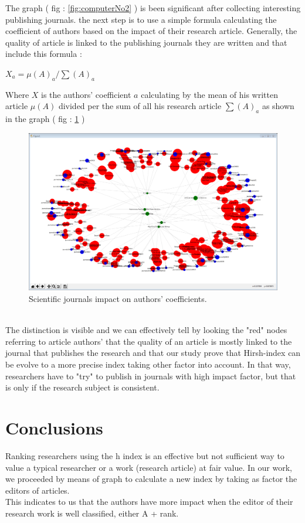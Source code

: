 \documentclass[times, twoside]{zHenriquesLab-StyleBioRxiv}
\begin{document}
The graph ( fig : \ref{fig:computerNo2} ) is been significant after collecting interesting publishing journals. the next step is to use a simple formula calculating the coefficient of authors based on the impact of their research article. Generally, the quality of article is linked to the publishing journals they are written and that include this formula :\\
\begin{center}
 $
    X_{a} = \mu (A)_{a} /\sum (A)_{a}
$
\end{center}
Where  $X$ is the authors' coefficient $a$ calculating by the mean of his written article $\mu (A)$ divided per the sum of all his research article $\sum (A)_{a}$ as shown in the graph ( fig : \ref{fig:computerNo3} )
\begin{figure}[h]
\centering
\includegraphics[width=.8\linewidth]{Figures/Graph_dernier.png}
\caption{Scientific journals impact on authors' coefficients.}
\label{fig:computerNo3}
\end{figure}
\\

The distinction is visible and we can effectively tell by looking the "red" nodes referring to article authors' that the quality of an article is mostly linked to the journal that publishes the research and that our study prove that Hirsh-index \cite{hirsch2005index} can be evolve to a more precise index taking other factor into account. In that way, researchers have to "try" to publish in journals with high impact factor, but that is only if the research subject is consistent.

\section*{Conclusions}

Ranking researchers using the h index is an effective but not sufficient way to value a typical researcher or a work (research article) at fair value. In our work, we proceeded by means of graph to calculate a new index by taking as factor the editors of articles.\\This indicates to us that the authors have more impact when the editor of their research work is well classified, either A + rank.\\
\end{document}
